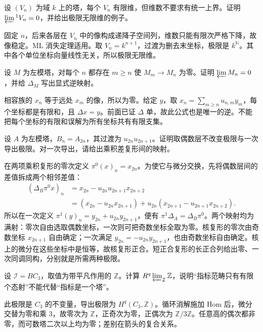 \begin{exercise}\label{b4:ex:13-stable-finite-dimensional}
	设 \((V_n)\) 为域 \(k\) 上的塔，每个 \(V_n\) 有限维，但维数不要求有统一上界。证明 \(\varprojlim{}^1V_n=0\)，并给出极限无限维的例子。
\end{exercise}
\begin{solution}
	固定 \(n\)，后来各层在 \(V_n\) 中的像构成递降子空间列，维数只能有限次严格下降，故像稳定。ML 消失定理适用。取 \(V_n=k^{n+1}\)，过渡为删去末坐标，极限是 \(k^{\mathbb N}\)。其中各个单位坐标向量线性无关，所以极限无限维。
\end{solution}

\begin{exercise}\label{b4:ex:13-eventually-zero}
	设 \(M\) 为左模塔，对每个 \(n\) 都存在 \(m\ge n\) 使 \(M_m\to M_n\) 为零。证明 \(\varprojlim M_n=0\)，并给 \(\Delta_M\) 写出显式逆映射。
\end{exercise}
\begin{solution}
	相容族的 \(x_n\) 等于远处 \(x_m\) 的像，所以为零。给定 \(y\)，取 \(x_n=\sum_{m\ge n}u_{n,m}y_m\)，每个坐标都是有限和，且 \(\Delta x=y\)。前面已证 \(\Delta\) 单，故此公式也是唯一的逆。不能把每个坐标的有限和误解为所有坐标共有有限支集。
\end{solution}

\begin{exercise}\label{b4:ex:13-even-subtower}
	设 \(A\) 为左模塔，\(B_n=A_{2n}\)，其过渡为 \(u_{2n}u_{2n+1}\)。证明取偶数层不改变极限与一次导出极限。对一次导出，请给出乘积差复形间的映射。
\end{exercise}
\begin{solution}
	在两项乘积复形的零次定义 \(\pi^0(x)_n=x_{2n}\)。为使它与微分交换，先将偶数层间的差值拆成两个相邻差值：
	\[
		\begin{aligned}
			(\Delta_B\pi^0x)_n &=x_{2n}-u_{2n}u_{2n+1}x_{2n+2}\\
			&=(x_{2n}-u_{2n}x_{2n+1}) +u_{2n}(x_{2n+1}-u_{2n+1}x_{2n+2}).
		\end{aligned}
	\]
	所以在一次定义 \(\pi^1(y)_n=y_{2n}+u_{2n}y_{2n+1}\)，便有 \(\pi^1\Delta_A=\Delta_B\pi^0\)。两个映射均为满射：零次自由选取偶数坐标，一次则可把奇数坐标全取为零。核复形的零次由奇数坐标 \(x_{2n+1}\) 自由确定；一次满足 \(y_{2n}=-u_{2n}y_{2n+1}\)，也由奇数坐标自由确定。核上的微分在这些坐标中是恒等，故核复形正合。短正合复形的长正合列给出零、一次同调同构，分别就是所需两种极限。
\end{solution}

\begin{exercise}\label{b4:ex:13-general-index-cyclic}
	设 \(\mathcal I=BC_3\)，取值为带平凡作用的 \(\mathbb Z\)。计算 \(R^q\varprojlim_{\mathcal I}\mathbb Z\)，说明“指标范畴只有有限个态射”不能代替“指标是一个塔”。
\end{exercise}
\begin{solution}
	此极限是 \(C_3\) 的不变量，导出极限为 \(H^q(C_3,\mathbb Z)\)。循环消解施加 Hom 后，微分交替为零和乘 \(3\)，故零次为 \(\mathbb Z\)，正奇次为零，正偶次为 \(\mathbb Z/3\mathbb Z\)。任意高的偶次都非零，而可数塔二次以上均为零；差别在箭头的复合关系。
\end{solution}

